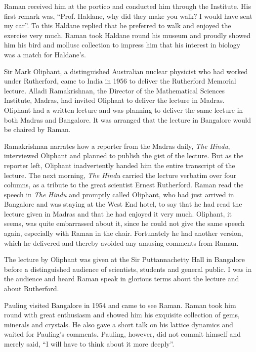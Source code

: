 Raman received him at the portico and conducted him
thro\-ugh the Institute. His first remark was, ``Prof. Haldane, why
did they make you walk? I would have sent my car''. To this
Haldane replied that he preferred to walk and enjoyed the exercise
very much. Raman took Haldane round his museum and proudly
showed him his bird and mollusc collection to impress him that
his interest in biology was a match for Haldane's.

\medskip
{}
\smallskip

\noindent
Sir Mark Oliphant, a distinguished Australian nuclear
physicist who had worked under Rutherford, came to India in
1956 to deliver the Rutherford Memorial lecture. Alladi Ramakrishnan, the Director of the Mathematical Sciences Institute,
Madras, had invited Oliphant to deliver the lecture in Madras.
Oliphant had a written lecture and was planning to deliver the
same lecture in both Madras and Bangalore. It was arranged that
the lecture in Bangalore would be chaired by Raman.

Ramakrishnan narrates how a reporter from the Madras
daily, {\em The Hindu}, interviewed Oliphant and planned to publish
the gist of the lecture. But as the reporter left, Oliphant
inadvertently handed him the entire transcript of the lecture.
The next morning, {\em The Hindu} carried the lecture verbatim over
four columns, as a tribute to the great scientist Ernest Rutherford.
Raman read the speech in {\em The Hindu} and promptly called
Oliphant, who had just arrived in Bangalore and was staying at
the West End hotel, to say that he had read the lecture given in
Madras and that he had enjoyed it very much. Oliphant, it seems,
was quite embarrassed about it, since he could not give the same
speech again, especially with Raman in the chair. Fortunately
he had another version, which he delivered and thereby avoided
any amusing comments from Raman.

The lecture by Oliphant was given at the Sir Puttannachetty
Hall in Bangalore before a distinguished audience of scientists,
students and general public. I was in the audience and heard
Raman speak in glorious terms about the lecture and about
Rutherford.

\smallskip
\medskip
{}
\medskip

\noindent
Pauling visited Bangalore in 1954 and came to see Raman. Raman took him round with great enthusiasm and showed him his exquisite collection of gems, minerals and crystals. He also gave a short talk on his lattice dynamics and waited for Pauling's comments. Pauling, however, did not commit himself and merely said, ``I will have to think about it more deeply''.

